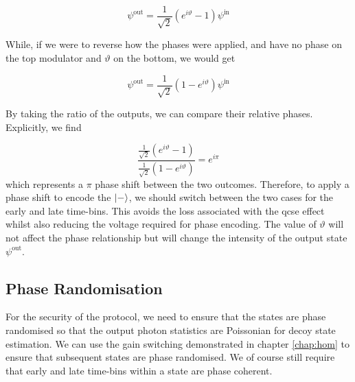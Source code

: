 \begin{parahigh}
\begin{equation}
	\psi^\mathrm{out} =  \frac{1}{\sqrt{2}}\left(e^{i\vartheta} -1\right) \psi^\mathrm{in}
\end{equation}
\end{parahigh}
While, if we were to reverse how the phases were applied, and have no phase on the top modulator and $\vartheta$ on the bottom, we would get

\begin{parahigh}
\begin{equation}
	\psi^\mathrm{out} =  \frac{1}{\sqrt{2}}\left(1 - e^{i\vartheta}\right) \psi^\mathrm{in}
\end{equation}
\end{parahigh}
By taking the ratio of the outputs, we can compare their relative phases. Explicitly, we find

\begin{parahigh}
\begin{equation}
	\frac{\frac{1}{\sqrt{2}}\left(e^{i\vartheta} -1\right)}{\frac{1}{\sqrt{2}}\left(1 - e^{i\vartheta}\right)} = e^{i\pi}
\end{equation}
which represents a $\pi$ phase shift between the two outcomes. Therefore, to apply a phase shift to encode the $\ket{-}$, we should switch between the two cases for the early and late time-bins. This avoids the loss associated with the \ac{qcse} effect whilst also reducing the voltage required for phase encoding. The value of $\vartheta$ will not affect the phase relationship but will change the intensity of the output state $\psi^\mathrm{out}$. 
\end{parahigh}


\subsection{Phase Randomisation}

For the security of the protocol, we need to ensure that the states are phase randomised so that the output photon statistics are Poissonian for decoy state estimation. We can use the gain switching demonstrated in chapter \ref{chap:hom} to ensure that subsequent states are phase randomised. We of course still require that early and late time-bins within a state are phase coherent. 

